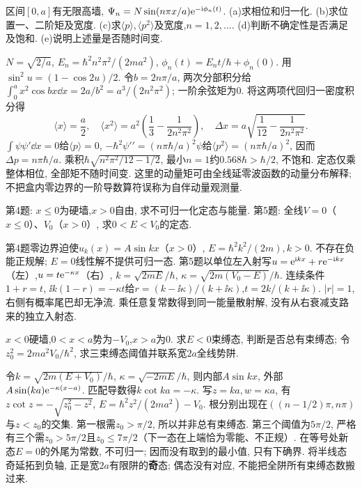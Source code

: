 \begin{exercise}
区间$[0,a]$有无限高墙, $\Psi_n=N\sin(n\pi x/a)\mathrm e^{-\mathrm i\phi_n(t)}$. (a)求相位和归一化. (b)求位置一、二阶矩及宽度. (c)求$\langle p\rangle,\langle p^2\rangle$及宽度,$n=1,2,\ldots$. (d)判断不确定性是否满足及饱和. (e)说明上述量是否随时间变.
\end{exercise}
\begin{solution}
$N=\sqrt{2/a}$, $E_n=\hbar^2n^2\pi^2/(2ma^2)$, $\phi_n(t)=E_nt/\hbar+\phi_n(0)$. 用$\sin^2u=(1-\cos2u)/2$. 令$b=2n\pi/a$, 两次分部积分给$\int_0^a x^2\cos bx\dd x=2a/b^2=a^3/(2n^2\pi^2)$; 一阶余弦矩为0. 将这两项代回归一密度积分得
\[
\langle x\rangle=\frac a2,\quad\langle x^2\rangle=a^2\left(\frac13-\frac1{2n^2\pi^2}\right),\quad
\Delta x=a\sqrt{\frac1{12}-\frac1{2n^2\pi^2}}.
\]
$\int\psi\psi'\dd x=0$给$\langle p\rangle=0$, $-\hbar^2\psi\prime\prime=(n\pi\hbar/a)^2\psi$给$\langle p^2\rangle=(n\pi\hbar/a)^2$, 因而$\Delta p=n\pi\hbar/a$. 乘积$\hbar\sqrt{n^2\pi^2/12-1/2}$, 最小$n=1$约$0.568\hbar>\hbar/2$, 不饱和. 定态仅乘整体相位, 全部矩不随时间变. 这里的动量矩可由全线延零波函数的动量分布解释; 不把盒内零边界的一阶导数算符误称为自伴动量观测量.
\end{solution}
\begin{exercise}
第4题: $x\leq0$为硬墙,$x>0$自由, 求不可归一化定态与能量. 第5题: 全线$V=0$（$x\leq0$）、$V_0$（$x>0$）, 求$0<E<V_0$的定态.
\end{exercise}
\begin{solution}
第4题零边界迫使$u_k(x)=A\sin kx$（$x>0$）, $E=\hbar^2k^2/(2m),k>0$. 不存在负能正规解; $E=0$线性解不提供可归一态. 第5题以单位左入射写$u=\mathrm e^{\mathrm i kx}+r\mathrm e^{-\mathrm i kx}$（左）,$u=t\mathrm e^{-\kappa x}$（右）, $k=\sqrt{2mE}/\hbar$, $\kappa=\sqrt{2m(V_0-E)}/\hbar$. 连续条件$1+r=t$, $\ii k(1-r)=-\kappa t$给$r=(k-\ii\kappa)/(k+\ii\kappa)$,$t=2k/(k+\ii\kappa)$. $|r|=1$, 右侧有概率尾巴却无净流. 乘任意复常数得到同一能量散射解, 没有从右衰减支路来的独立入射态.
\end{solution}
\begin{exercise}
$x<0$硬墙,$0<x<a$势为$-V_0$,$x>a$为0. 求$E<0$束缚态, 判断是否总有束缚态; 令$z_0^2=2ma^2V_0/\hbar^2$, 求三束缚态阈值并联系宽$2a$全线势阱.
\end{exercise}
\begin{solution}
令$k=\sqrt{2m(E+V_0)}/\hbar$, $\kappa=\sqrt{-2mE}/\hbar$, 则内部$A\sin kx$, 外部$A\sin(ka)\mathrm e^{-\kappa(x-a)}$. 匹配导数得$k\cot ka=-\kappa$. 写$z=ka,w=\kappa a$, 有$z\cot z=-\sqrt{z_0^2-z^2}$, $E=\hbar^2z^2/(2ma^2)-V_0$. 根分别出现在$((n-1/2)\pi,n\pi)$与$z<z_0$的交集. 第一根需$z_0>\pi/2$, 所以并非总有束缚态. 第三个阈值为$5\pi/2$, 严格有三个需$z_0>5\pi/2$且$z_0\leq7\pi/2$（下一态在上端恰为零能、不正规）. 在等号处新态$E=0$的外尾为常数, 不可归一; 因而没有取到的最小值, 只有下确界. 将半线态奇延拓到负轴, 正是宽$2a$有限阱的\textbf{奇}态; 偶态没有对应, 不能把全阱所有束缚态数搬过来.
\end{solution}

